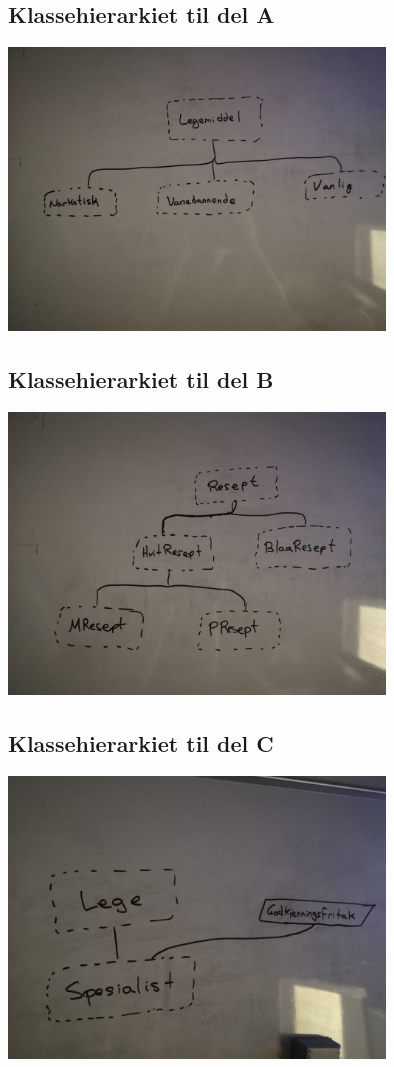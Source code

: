 \documentclass{../../myassignment}
\begin{document}
	\subsection*{Klassehierarkiet til del A}
	\includegraphics[width=0.75\textwidth]{legemidler.jpg}

	\subsection*{Klassehierarkiet til del B}
	\includegraphics[width=0.75\textwidth]{resepter.jpg}

	\subsection*{Klassehierarkiet til del C}
	\includegraphics[width=0.75\textwidth]{leger.jpg}
\end{document}
